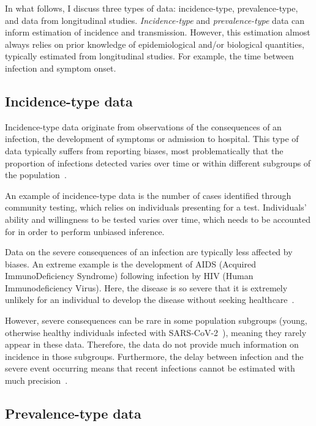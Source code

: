 \documentclass[thesis.tex]{subfiles}
\begin{document}
In what follows, I discuss three types of data: incidence-type, prevalence-type, and data from longitudinal studies.
\emph{Incidence-type} and \emph{prevalence-type} data can inform estimation of incidence and transmission.
However, this estimation almost always relies on prior knowledge of epidemiological and/or biological quantities, typically estimated from longitudinal studies.
For example, the time between infection and symptom onset.

\subsection{Incidence-type data}

Incidence-type data originate from observations of the consequences of an infection, \eg the development of symptoms or admission to hospital.
This type of data typically suffers from reporting biases, most problematically that the proportion of infections detected varies over time or within different subgroups of the population~\autocites[chapter 9]{lashModern}{shadboltChallenges}.

An example of incidence-type data is the number of cases identified through community testing, which relies on individuals presenting for a test.
Individuals' ability and willingness to be tested varies over time, which needs to be accounted for in order to perform unbiased inference.

Data on the severe consequences of an infection are typically less affected by biases.
An extreme example is the development of AIDS (Acquired ImmunoDeficiency Syndrome) following infection by HIV (Human Immunodeficiency Virus).
Here, the disease is so severe that it is extremely unlikely for an individual to develop the disease without seeking healthcare~\autocite{evansCompleteness}.

However, severe consequences can be rare in some population subgroups (\eg young, otherwise healthy individuals infected with SARS-CoV-2~\autocite{wardSero,bhopalChildren}), meaning they rarely appear in these data.
Therefore, the data do not provide much information on incidence in those subgroups.
Furthermore, the delay between infection and the severe event occurring means that recent infections cannot be estimated with much precision~\autocite{swallow2022challenges}.

\subsection{Prevalence-type data}
\end{document}
